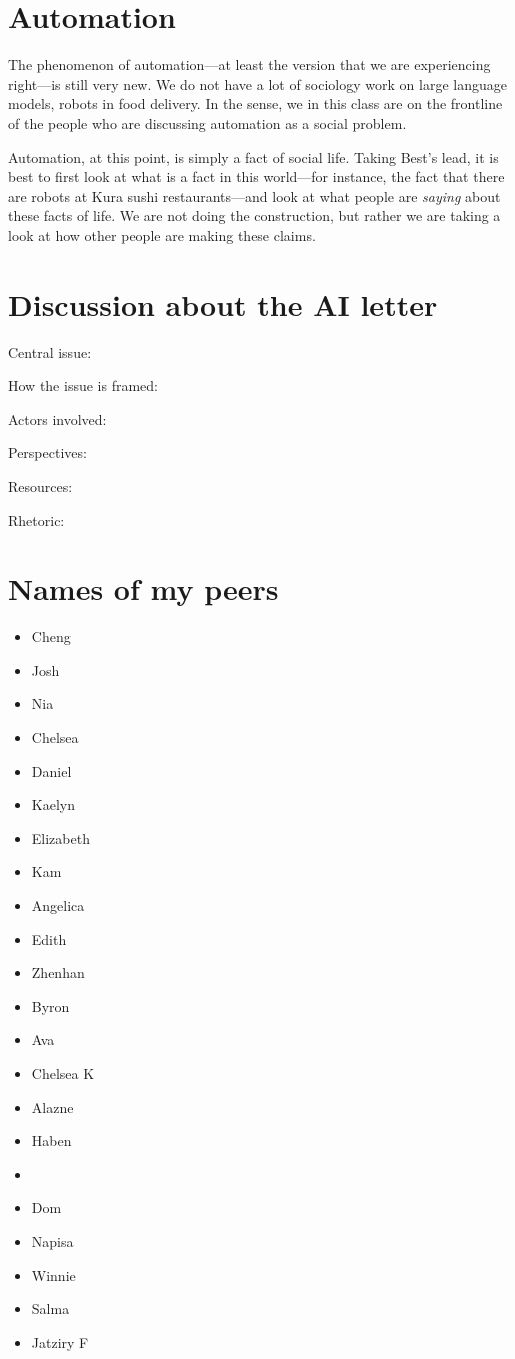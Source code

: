\section{Automation}
The phenomenon of automation---at least the version that we are experiencing right---is still very new.
We do not have a lot of sociology work on large language models, robots in food delivery.
In the sense, we in this class are on the frontline of the people who are discussing automation as a social problem.

Automation, at this point, is simply a fact of social life.
Taking Best's lead, it is best to first look at what is a fact in this world---for instance, the fact that there are robots at Kura sushi restaurants---and look at what people are \textit{saying} about these facts of life.
We are not doing the construction, but rather we are taking a look at how other people are making these claims.

\section{Discussion about the AI letter}

Central issue: 

How the issue is framed:

Actors involved:

Perspectives:

Resources:

Rhetoric:



\newpage
\section{Names of my peers}

\begin{itemize}
    \item Cheng
    \item Josh
    \item Nia
    \item Chelsea
    \item Daniel
    \item Kaelyn
    \item Elizabeth
    \item Kam
    \item Angelica
    \item Edith
    \item Zhenhan
    \item Byron
    \item Ava
    \item Chelsea K
    \item Alazne
    \item Haben
    \item 
    \item Dom
    \item Napisa
    \item Winnie
    \item Salma
    \item Jatziry F
\end{itemize}
